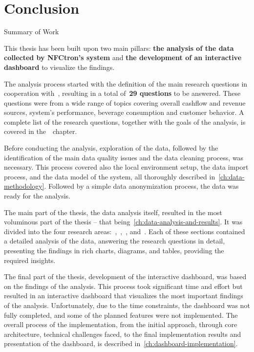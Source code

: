 \chapter{Conclusion}
\label{ch:conclusion}


\begin{section}{Summary of Work}
	\label{sec:conclusion-summary}

	This thesis has been built upon two main pillars: \textbf{the analysis of the data collected by NFCtron's system} and \textbf{the development of an interactive dashboard} to visualize the findings.

	The analysis process started with the definition of the main research questions in cooperation with~\theOrganizer, resulting in a total of~\textbf{29 questions} to be answered.
	These questions were from a wide range of topics covering overall cashflow and revenue sources, system's performance, beverage consumption and customer behavior.
	A complete list of the research questions, together with the goals of the analysis, is covered in the~~chapter.

	Before conducting the analysis, exploration of the data, followed by the identification of the main data quality issues and the data cleaning process, was necessary.
	This process covered also the local environment setup, the data import process, and the data model of the system, all thoroughly described in~\autoref{ch:data-methodology}.
	Followed by a simple data anonymization process, the data was ready for the analysis.

	The main part of the thesis, the data analysis itself, resulted in the most voluminous part of the thesis – that being~\autoref{ch:data-analysis-and-results}.
	It was divided into the four research areas:~,~,~, and~.
	Each of these sections contained a detailed analysis of the data, answering the research questions in detail, presenting the findings in rich charts, diagrams, and tables, providing the required insights.

	The final part of the thesis, development of the interactive dashboard, was based on the findings of the analysis.
	This process took significant time and effort but resulted in an interactive dashboard that visualizes the most important findings of the analysis.
	Unfortunately, due to the time constraints, the dashboard was not fully completed, and some of the planned features were not implemented.
	The overall process of the implementation, from the initial approach, through core architecture, technical challenges faced, to the final implementation results and presentation of the dashboard, is described in~\autoref{ch:dashboard-implementation}.


\end{section}
